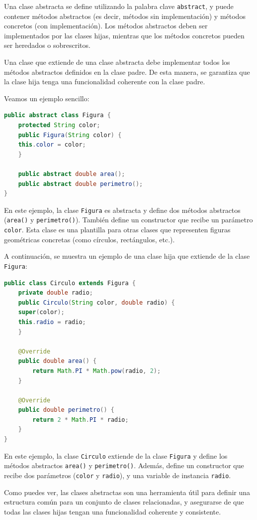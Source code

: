\documentclass[executivepaper]{article}
\begin{document}
Una clase abstracta se define utilizando la palabra clave \texttt{abstract}, y puede contener métodos abstractos (es decir, métodos sin implementación) y métodos concretos (con implementación). Los métodos abstractos deben ser implementados por las clases hijas, mientras que los métodos concretos pueden ser heredados o sobrescritos.

Una clase que extiende de una clase abstracta debe implementar todos los métodos abstractos definidos en la clase padre. De esta manera, se garantiza que la clase hija tenga una funcionalidad coherente con la clase padre.

Veamos un ejemplo sencillo:

\begin{lstlisting}[language=Java]
public abstract class Figura {
    protected String color;
    public Figura(String color) {
    this.color = color;
    }

    public abstract double area();
    public abstract double perimetro();
}
\end{lstlisting}
En este ejemplo, la clase \texttt{Figura} es abstracta y define dos métodos abstractos (\texttt{area()} y \texttt{perimetro()}). También define un constructor que recibe un parámetro \texttt{color}. Esta clase es una plantilla para otras clases que representen figuras geométricas concretas (como círculos, rectángulos, etc.).

A continuación, se muestra un ejemplo de una clase hija que extiende de la clase \texttt{Figura}:
\begin{lstlisting}[language=Java]
    public class Circulo extends Figura {
    private double radio;
    public Circulo(String color, double radio) {
    super(color);
    this.radio = radio;
    }

    @Override
    public double area() {
        return Math.PI * Math.pow(radio, 2);
    }

    @Override
    public double perimetro() {
        return 2 * Math.PI * radio;
    }
}
\end{lstlisting}    
En este ejemplo, la clase \texttt{Circulo} extiende de la clase \texttt{Figura} y define los métodos abstractos \texttt{area()} y \texttt{perimetro()}. Además, define un constructor que recibe dos parámetros (\texttt{color} y \texttt{radio}), y una variable de instancia \texttt{radio}.

Como puedes ver, las clases abstractas son una herramienta útil para definir una estructura común para un conjunto de clases relacionadas, y asegurarse de que todas las clases hijas tengan una funcionalidad coherente y consistente.
\end{document}
